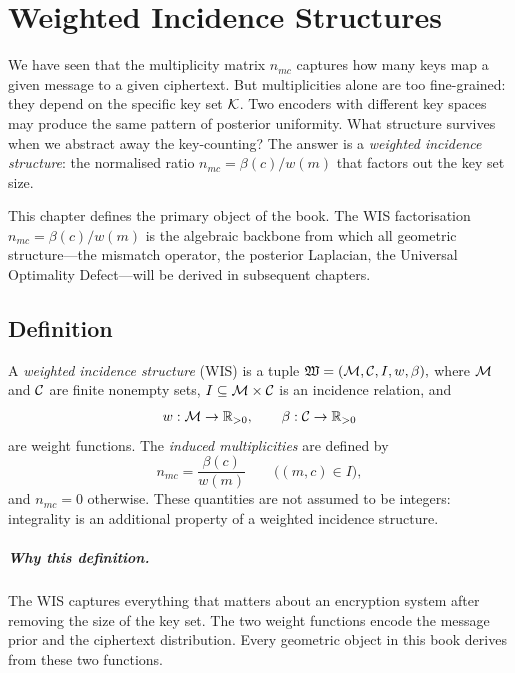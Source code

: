 \chapter[WIS]{Weighted Incidence Structures}\label{ch:sec:wis}
We have seen that the multiplicity matrix $n_{mc}$ captures how many keys
map a given message to a given ciphertext.  But multiplicities alone
are too fine-grained: they depend on the specific key set $\mathcal{K}$.
Two encoders with different key spaces may produce the same pattern of
posterior uniformity.  What structure survives when we abstract away the
key-counting?  The answer is a \emph{weighted incidence structure}:
the normalised ratio $n_{mc}=\beta(c)/w(m)$ that factors out the key
set size.

This chapter defines the primary object of the book. The WIS factorisation $n_{mc}=\beta(c)/w(m)$ is the algebraic backbone from which all geometric structure---the mismatch operator, the posterior Laplacian, the Universal Optimality Defect---will be derived in subsequent chapters.


\section{Definition}\label{ch:sec:definition}
\begin{definition}\label{ch:def:wis}
A \emph{weighted incidence structure} (WIS) is a tuple $\mathfrak W=(\mathcal{M},\mathcal{C},I,w,\beta),$ where $\mathcal{M}$ and $\mathcal{C}$ are finite nonempty sets, $I\subseteq\mathcal{M}\times\mathcal{C}$ is an incidence relation, and
\[
 w:\mathcal{M}\to\mathbb R_{>0},\qquad
 \beta:\mathcal{C}\to\mathbb R_{>0}
\]
are weight functions.
The \emph{induced multiplicities} are defined by
\[
 n_{mc}=\frac{\beta(c)}{w(m)} \qquad\bigl((m,c)\in I\bigr), \label{ch:eq:wis-factorisation}
\]
and $n_{mc}=0$ otherwise.  These quantities are not assumed to be integers: integrality is an additional property of a weighted incidence structure.
\end{definition}

\paragraph{Why this definition.}
The WIS captures everything that matters about an encryption system after removing the size of the key set.  The two weight functions encode the message prior and the ciphertext distribution.  Every geometric object in this book derives from these two functions.

